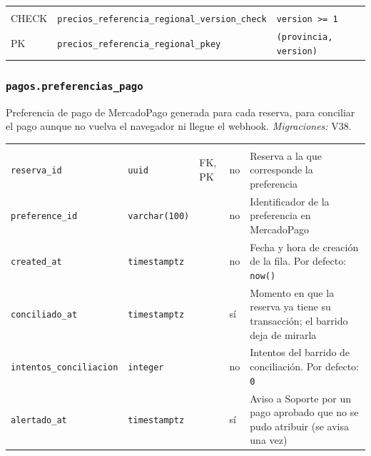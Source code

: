 {\small
\begin{xltabular}{\textwidth}{@{}>{\raggedright\arraybackslash}p{1.7cm} >{\raggedright\arraybackslash}p{4.6cm} L@{}}
    \toprule
     &  &  \\
    \midrule
    \endfirsthead
    \toprule
     &  &  \\
    \midrule
    \endhead
    \bottomrule
    \endfoot
    CHECK & \texttt{precios\_\allowbreak{}referencia\_\allowbreak{}regional\_\allowbreak{}version\_\allowbreak{}check} & \texttt{version \textgreater{}= 1} \\
    PK & \texttt{precios\_\allowbreak{}referencia\_\allowbreak{}regional\_\allowbreak{}pkey} & \texttt{(\allowbreak{}provincia,\allowbreak{} version)} \\
\end{xltabular}
}

\subsubsection{\texorpdfstring{\texttt{pagos.preferencias\_\allowbreak{}pago}}{pagos.preferencias\_pago}}\label{dd:pagos.preferencias_pago}

Preferencia de pago de MercadoPago generada para cada reserva, para conciliar el pago aunque no vuelva el navegador ni llegue el webhook. \emph{Migraciones:} V38.

{\small
\begin{xltabular}{\textwidth}{@{}>{\raggedright\arraybackslash}p{3.6cm} >{\raggedright\arraybackslash}p{2.3cm} >{\raggedright\arraybackslash}p{1cm} >{\centering\arraybackslash}p{0.85cm} L@{}}
    \toprule
     &  &  &  &  \\
    \midrule
    \endfirsthead
    \toprule
     &  &  &  &  \\
    \midrule
    \endhead
    \bottomrule
    \endfoot
    \texttt{reserva\_\allowbreak{}id} & \texttt{uuid} & FK, PK & no & Reserva a la que corresponde la preferencia \\
    \texttt{preference\_\allowbreak{}id} & \texttt{varchar(\allowbreak{}100)} &  & no & Identificador de la preferencia en MercadoPago \\
    \texttt{created\_\allowbreak{}at} & \texttt{timestamptz} &  & no & Fecha y hora de creación de la fila. Por defecto: \texttt{now(\allowbreak{})} \\
    \texttt{conciliado\_\allowbreak{}at} & \texttt{timestamptz} &  & sí & Momento en que la reserva ya tiene su transacción; el barrido deja de mirarla \\
    \texttt{intentos\_\allowbreak{}conciliacion} & \texttt{integer} &  & no & Intentos del barrido de conciliación. Por defecto: \texttt{0} \\
    \texttt{alertado\_\allowbreak{}at} & \texttt{timestamptz} &  & sí & Aviso a Soporte por un pago aprobado que no se pudo atribuir (se avisa una vez) \\
\end{xltabular}
}

